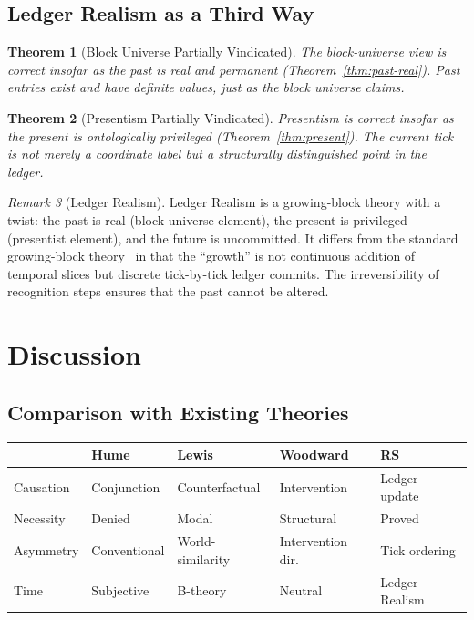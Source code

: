 \documentclass[12pt,a4paper]{article}
\newtheorem{theorem}{Theorem}[section]
\theoremstyle{definition}
\theoremstyle{remark}
\newtheorem{remark}[theorem]{Remark}
\begin{document}
\subsection{Ledger Realism as a Third Way}

\begin{theorem}[Block Universe Partially Vindicated]
\label{thm:block}
The block-universe view is correct insofar as the past is real and
permanent (Theorem~\ref{thm:past-real}).  Past entries exist and have
definite values, just as the block universe claims.
\end{theorem}

\begin{theorem}[Presentism Partially Vindicated]
\label{thm:presentism}
Presentism is correct insofar as the present is ontologically
privileged (Theorem~\ref{thm:present}).  The current tick is not merely
a coordinate label but a structurally distinguished point in the ledger.
\end{theorem}

\begin{remark}[Ledger Realism]
Ledger Realism is a growing-block theory with a twist: the past is
real (block-universe element), the present is privileged (presentist
element), and the future is uncommitted.  It differs from the standard
growing-block theory~\cite{Broad1923} in that the ``growth'' is not
continuous addition of temporal slices but discrete tick-by-tick ledger
commits.  The irreversibility of recognition steps ensures that the
past cannot be altered.
\end{remark}

\section{Discussion}
\label{sec:discuss}

\subsection{Comparison with Existing Theories}

\begin{center}
\renewcommand{\arraystretch}{1.3}
\begin{tabular}{@{}p{3cm}p{3cm}p{3cm}p{3cm}p{3cm}@{}}
\toprule
& \textbf{Hume} & \textbf{Lewis} & \textbf{Woodward} & \textbf{RS} \\
\midrule
Causation & Conjunction & Counterfactual & Intervention & Ledger update \\
Necessity & Denied & Modal & Structural & Proved \\
Asymmetry & Conventional & World-similarity & Intervention dir. & Tick ordering \\
Time & Subjective & B-theory & Neutral & Ledger Realism \\
\bottomrule
\end{tabular}
\end{center}
\end{document}
